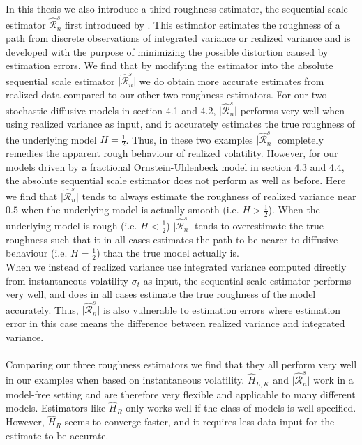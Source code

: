 \documentclass{article}
\begin{document}
In this thesis we also introduce a third roughness estimator, the sequential scale estimator $\widehat{\mathscr{R}}_n^s$ first introduced by \cite{han}. This estimator estimates the roughness of a path from discrete observations of integrated variance or realized variance and is developed with the purpose of minimizing the possible distortion caused by estimation errors. We find that by modifying the estimator into the absolute sequential scale estimator $\lvert \widehat{\mathscr{R}}_n^s \rvert$ we do obtain more accurate estimates from realized data compared to our other two roughness estimators. For our two stochastic diffusive models in section 4.1 and 4.2, $\lvert \widehat{\mathscr{R}}_n^s \rvert$ performs very well when using realized variance as input, and it accurately estimates the true roughness of the underlying model $H=\frac{1}{2}$. Thus, in these two examples $\lvert \widehat{\mathscr{R}}_n^s \rvert$ completely remedies the apparent rough behaviour of realized volatility. However, for our models driven by a fractional Ornstein-Uhlenbeck model in section 4.3 and 4.4, the absolute sequential scale estimator does not perform as well as before. Here we find that $\lvert \widehat{\mathscr{R}}_n^s \rvert$ tends to always estimate the roughness of realized variance near $0.5$ when the underlying model is actually smooth (i.e. $H>\frac{1}{2}$). When the underlying model is rough (i.e. $H<\frac{1}{2}$) $\lvert \widehat{\mathscr{R}}_n^s \rvert$ tends to overestimate the true roughness such that it in all cases estimates the path to be nearer to diffusive behaviour (i.e. $H=\frac{1}{2}$) than the true model actually is. \\
When we instead of realized variance use integrated variance computed directly from instantaneous volatility $\sigma_t$ as input, the sequential scale estimator performs very well, and does in all cases estimate the true roughness of the model accurately. Thus, $\lvert \widehat{\mathscr{R}}_n^s \rvert$ is also vulnerable to estimation errors where estimation error in this case means the difference between realized variance and integrated variance. \\\\
Comparing our three roughness estimators we find that they all perform very well in our examples when based on instantaneous volatility. $\widehat{H}_{L,K}$ and $\lvert \widehat{\mathscr{R}}_n^s \rvert$ work in a model-free setting and are therefore very flexible and applicable to many different models. Estimators like $\widehat{H}_R$ only works well if the class of models is well-specified. However, $\widehat{H}_R$ seems to converge faster, and it requires less data input for the estimate to be accurate.\\
\end{document}
